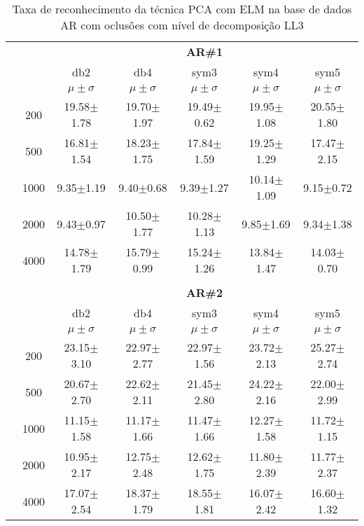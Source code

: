 \begin{table}[H]
	\centering
    \normalsize
	\caption{Taxa de reconhecimento da técnica PCA com ELM na base de dados AR com oclusões com nível de decomposição LL3}
   \hspace{0.5in}
	\begin{tabular}{|c|c|c c c c c|}
\cline{3-7}
\multicolumn{2}{c|}{\multirow{3}{*}{}} & \multicolumn{5}{c|}{\textbf{AR\#1}}   \\\cline{3-7} 
\multicolumn{2}{c|}{}  & db2 & db4 & sym3 & sym4 & sym5 \\\cline{3-7}%
\multicolumn{2}{c|}{}& $\mu \pm \sigma$ & $\mu \pm \sigma$ & $\mu \pm \sigma$ & $\mu \pm \sigma$ & $\mu \pm \sigma$ \\\hline


\multicolumn{1}{|c|}{ \multirow{5}{*}{\rotatebox[origin=c]{90}{\textbf{Neurônios}}} }
&200	&19.58$\pm$1.78	&19.70$\pm$1.97	&19.49$\pm$0.62	&19.95$\pm$1.08	&20.55$\pm$1.80	\\\cline{2-7}
&500	&16.81$\pm$1.54	&18.23$\pm$1.75	&17.84$\pm$1.59	&19.25$\pm$1.29	&17.47$\pm$2.15	\\\cline{2-7}
&1000	&9.35$\pm$1.19	&9.40$\pm$0.68	&9.39$\pm$1.27	&10.14$\pm$1.09	&9.15$\pm$0.72	\\\cline{2-7}
&2000	&9.43$\pm$0.97	&10.50$\pm$1.77	&10.28$\pm$1.13	&9.85$\pm$1.69	&9.34$\pm$1.38	\\\cline{2-7}
&4000	&14.78$\pm$1.79	&15.79$\pm$0.99	&15.24$\pm$1.26	&13.84$\pm$1.47	&14.03$\pm$0.70	



\\\midrule%

\multicolumn{7}{c}{}\\ 

\cline{3-7}
\multicolumn{2}{c|}{\multirow{3}{*}{}} & \multicolumn{5}{c|}{\textbf{AR\#2}}   \\\cline{3-7} 

\multicolumn{2}{c|}{}  & db2 & db4 & sym3 & sym4 & sym5 \\\cline{3-7}
\multicolumn{2}{c|}{}& $\mu \pm \sigma$ & $\mu \pm \sigma$ & $\mu \pm \sigma$ & $\mu \pm \sigma$ & $\mu \pm \sigma$ \\\hline


\multicolumn{1}{|c|}{ \multirow{5}{*}{\rotatebox[origin=c]{90}{\textbf{Neurônios}}} }
&200	&23.15$\pm$3.10	&22.97$\pm$2.77	&22.97$\pm$1.56	&23.72$\pm$2.13	&25.27$\pm$2.74	\\\cline{2-7}
&500	&20.67$\pm$2.70	&22.62$\pm$2.11	&21.45$\pm$2.80	&24.22$\pm$2.16	&22.00$\pm$2.99	\\\cline{2-7}
&1000	&11.15$\pm$1.58	&11.17$\pm$1.66	&11.47$\pm$1.66	&12.27$\pm$1.58	&11.72$\pm$1.15	\\\cline{2-7}
&2000	&10.95$\pm$2.17	&12.75$\pm$2.48	&12.62$\pm$1.75	&11.80$\pm$2.39	&11.77$\pm$2.37	\\\cline{2-7}
&4000	&17.07$\pm$2.54	&18.37$\pm$1.79	&18.55$\pm$1.81	&16.07$\pm$2.42	&16.60$\pm$1.32	




\end{tabular}
\end{table}
